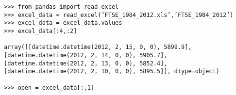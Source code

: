 \documentclass[11pt]{article} %
\begin{document}
\begin{framed}
\begin{verbatim}
>>> from pandas import read_excel
>>> excel_data = read_excel(’FTSE_1984_2012.xls’,’FTSE_1984_2012’)
>>> excel_data = excel_data.values
>>> excel_data[:4,:2]

array([[datetime.datetime(2012, 2, 15, 0, 0), 5899.9],
[datetime.datetime(2012, 2, 14, 0, 0), 5905.7],
[datetime.datetime(2012, 2, 13, 0, 0), 5852.4],
[datetime.datetime(2012, 2, 10, 0, 0), 5895.5]], dtype=object)

>>> open = excel_data[:,1]
\end{verbatim}
\end{framed}
\end{document}
